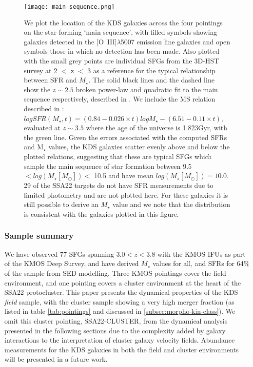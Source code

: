 \documentclass[fleqn,usenatbib]{mn2e}
\begin{document}
\begin{figure}
\centering
\texttt{[image: main\_sequence.png]}
\caption{We plot the location of the KDS galaxies across the four pointings on the star forming `main sequence', with filled symbols showing galaxies detected in the [O~{\sc III}]$\lambda$5007 emission line galaxies and open symbols those in which no detection has been made. 
Also plotted with the small grey points are individual SFGs from the 3D-HST survey  \protect\citep{Brammer2012,Momcheva2016} at 2 $<$ z $<$ 3 as a reference for the typical relationship between SFR and $M_{\star}$.
The solid black lines and the dashed line show the $z\sim2.5$ broken power-law and quadratic fit to the main sequence respectively, described in \protect\cite{Whitaker2014}.
We include the MS relation described in \protect\cite{Speagle2014}: $logSFR(M_{\star}, t) = (0.84 - 0.026 \times t)logM_{\star} - (6.51 - 0.11 \times t)$, evaluated at $z\sim3.5$ where the age of the universe is 1.823Gyr, with the green line. 
Given the errors associated with the computed SFRs and M$_{\star}$ values, the KDS galaxies scatter evenly above and below the plotted relations, suggesting that these are typical SFGs which sample the main sequence of star formation between 9.5 $< log(M_{\star}[M_{\odot}]) <$ 10.5 and have mean $log(M_{\star}[M_{\odot}]) = 10.0$.
29 of the SSA22 targets do not have SFR measurements due to limited photometry and are not plotted here.
For these galaxies it is still possible to derive an $M_{\star}$ value and we note that the distribution is consistent with the galaxies plotted in this figure.}
\label{fig:main_sequence}
\end{figure}

\subsubsection{Sample summary}\label{subsubsec:sample_summary}
We have observed 77 SFGs spanning $3.0 < z < 3.8$ with the KMOS IFUs as part of the KMOS Deep Survey, and have derived $M_{\star}$ values for all, and SFRs for 64\% of the sample from SED modelling.
Three KMOS pointings cover the field environment, and one pointing covers a cluster environment at the heart of the SSA22 protocluster.
This paper presents the dynamical properties of the KDS \textit{field} sample, with the cluster sample showing a very high merger fraction (as listed in table \ref{tab:pointings} and discussed in \cref{subsec:morpho-kin-class}).
We omit this cluster pointing, SSA22-CLUSTER, from the dynamical analysis presented in the following sections due to the complexity added by galaxy interactions to the interpretation of cluster galaxy velocity fields.
Abundance measurements for the KDS galaxies in both the field and cluster environments will be presented in a future work.
\end{document}
